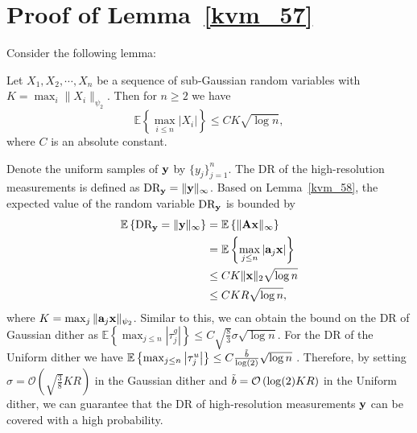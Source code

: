 \documentclass[12pt,draftcls,onecolumn]{IEEEtran}
\begin{document}
\section{Proof of Lemma~\ref{kvm_57}}
\label{fy}
Consider the following lemma:
\begin{lemma}\cite[Section~2.5.2]{vershynin2018high}
\label{kvm_58}
Let $X_1,X_2,\cdots,X_n$ be a sequence of sub-Gaussian random variables with $K=\max_i\|X_i\|_{\psi_2}$. Then for $n\geq 2$ we have
\begin{equation}
\label{kvm_59}
\mathbb{E}\left\{\max_{i \leq n}\left|X_i\right|\right\} \leq C K \sqrt{\log n},
\end{equation}
where $C$ is an absolute constant.
\end{lemma}
Denote the uniform samples of $\mathbf{y}$ by $\{y_j\}_{j=1}^{n}$. 
The DR of the high-resolution measurements is defined as $\text{DR}_{\mathbf{y}}=\|\mathbf{y}\|_{\infty}$. Based on Lemma~\ref{kvm_58}, the expected value of the random variable $\text{DR}_{\mathbf{y}}$ is bounded by
\begin{equation}
\label{kvm_60}
\begin{aligned}
\mathbb{E}\left\{\text{DR}_{\mby}=\|\mby\|_{\infty}\right\}&=\mathbb{E}\left\{\|\mbA\mbx\|_{\infty}\right\}\\&=\mathbb{E}\left\{\max_{j \leq n}\left|\mba_j\mbx\right|\right\}\\&\leq CK\|\mbx\|_2\sqrt{\log n}\\&\leq CKR\sqrt{\log n},
\end{aligned}
\end{equation}
where $K=\max_j\|\mathbf{a}_j\mathbf{x}\|_{\psi_2}$. 
Similar to this, we can obtain the bound on the DR of Gaussian dither as $\mathbb{E}\left\{\max_{j \leq n}\left|\tau_j^{g}\right|\right\}\leq C\sqrt{\frac{8}{3}}\sigma\sqrt{\log n}$. For the DR of the Uniform dither we have $\mathbb{E}\left\{\max_{j \leq n}\left|\tau_j^{u}\right|\right\}\leq C\frac{\Tilde{b}}{\log (2)}\sqrt{\log n}$ \cite[Section~2.5.2]{vershynin2018high}. Therefore, by setting $\sigma=\mathcal{O}(\sqrt{\frac{3}{8}}KR)$ in the Gaussian dither and $\Tilde{b}=\mathcal{O}\left(\log(2) KR\right)$ in the Uniform dither, we can guarantee that the DR of high-resolution measurements $\mathbf{y}$ can be covered with a high probability.
\end{document}
